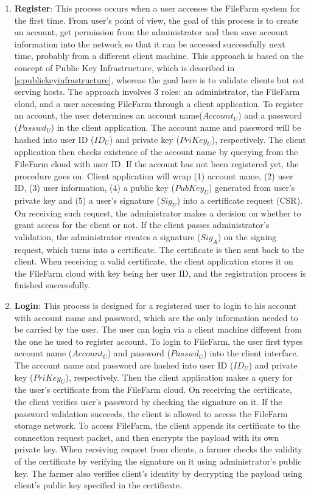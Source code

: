 \begin{enumerate}
  \item \textbf{Register}: This process occurs when a user accesses the FileFarm system for the first time. From user's point of view, the goal of this process is to create an account, get permission from the administrator and then save account information into the network so that it can be accessed successfully next time, probably from a different client machine. This approach is based on the concept of Public Key Infrastructure, which is described in \ref{s:publickeyinfrastructure}, whereas the goal here is to validate clients but not serving hosts. The approach involves 3 roles: an administrator, the FileFarm cloud, and a user accessing FileFarm through a client application. To register an account, the user determines an account name($Account_{U}$) and a password ($Passwd_{U}$) in the client application. The account name and password will be hashed into user ID ($ID_{U}$) and private key ($PriKey_{U}$), respectively. The client application then checks existence of the account name by querying from the FileFarm cloud with user ID. If the account has not been registered yet, the procedure goes on. Client application will wrap (1) account name, (2) user ID, (3) user information, (4) a public key ($PubKey_{U}$) generated from user's private key and (5) a user's signature ($Sig_{U}$) into a certificate request (CSR). On receiving such request, the administrator makes a decision on whether to grant access for the client or not. If the client passes administrator's validation, the administrator creates a signature ($Sig_{A}$) on the signing request, which turns into a certificate. The certificate is then sent back to the client. When receiving a valid certificate, the client application stores it on the FileFarm cloud with key being her user ID, and the registration process is finished successfully.

  \item \textbf{Login}: This process is designed for a registered user to login to his account with account name and password, which are the only information needed to be carried by the user. The user can login via a client machine different from the one he used to register account. To login to FileFarm, the user first types account name ($Account_{U}$) and password ($Passwd_{U}$) into the client interface. The account name and password are hashed into user ID ($ID_{U}$) and private key ($PriKey_{U}$), respectively. Then the client application makes a query for the user's certificate from the FileFarm cloud. On receiving the certificate, the client verifies user's password by checking the signature on it. If the password validation succeeds, the client is allowed to access the FileFarm storage network. To access FileFarm, the client appends its certificate to the connection request packet, and then encrypts the payload with its own private key. When receiving request from clients, a farmer checks the validity of the certificate by verifying the signature on it using administrator's public key. The farmer also verifies client's identity by decrypting the payload using client's public key specified in the certificate.
\end{enumerate}

